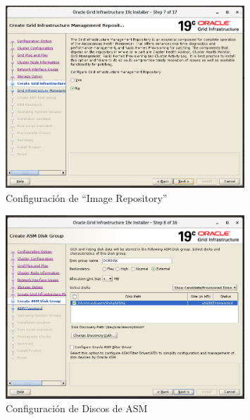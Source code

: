 \documentclass{article}
\begin{document}
\begin{figure}[H]
		\begin{center}
			\includegraphics[width=0.80\textwidth]{grid_install_07_create_grid_management_infraestructure.png}
		\end{center}
		\caption{Configuración de ``Image Repository''}
\end{figure}

\begin{figure}[H]
		\begin{center}
			\includegraphics[width=0.80\textwidth]{grid_install_08_create_asm_group.png}
		\end{center}
		\caption{Configuración de Discos de ASM}
\end{figure}
\end{document}
